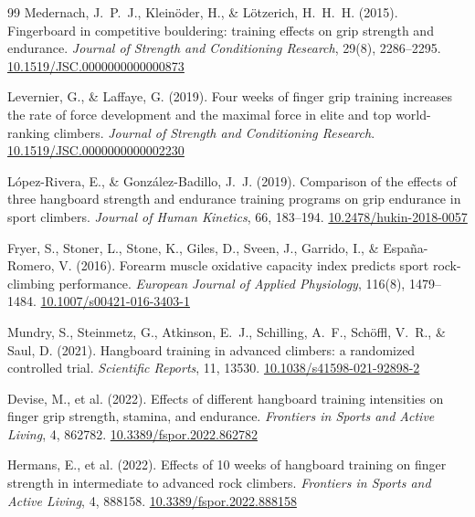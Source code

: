 \documentclass[12pt,a4paper]{article}
\begin{document}
\begin{thebibliography}{99}
Medernach, J.~P.~J., Kleinöder, H., \& Lötzerich, H.~H.~H. (2015).
Fingerboard in competitive bouldering: training effects on grip strength and endurance.
\textit{Journal of Strength and Conditioning Research}, 29(8), 2286--2295.
\href{https://doi.org/10.1519/JSC.0000000000000873}{10.1519/JSC.0000000000000873}

Levernier, G., \& Laffaye, G. (2019).
Four weeks of finger grip training increases the rate of force development and the maximal force in elite and top world-ranking climbers.
\textit{Journal of Strength and Conditioning Research}.
\href{https://doi.org/10.1519/JSC.0000000000002230}{10.1519/JSC.0000000000002230}

López-Rivera, E., \& González-Badillo, J.~J. (2019).
Comparison of the effects of three hangboard strength and endurance training programs on grip endurance in sport climbers.
\textit{Journal of Human Kinetics}, 66, 183--194.
\href{https://doi.org/10.2478/hukin-2018-0057}{10.2478/hukin-2018-0057}

Fryer, S., Stoner, L., Stone, K., Giles, D., Sveen, J., Garrido, I., \& España-Romero, V. (2016).
Forearm muscle oxidative capacity index predicts sport rock-climbing performance.
\textit{European Journal of Applied Physiology}, 116(8), 1479--1484.
\href{https://doi.org/10.1007/s00421-016-3403-1}{10.1007/s00421-016-3403-1}

Mundry, S., Steinmetz, G., Atkinson, E.~J., Schilling, A.~F., Schöffl, V.~R., \& Saul, D. (2021).
Hangboard training in advanced climbers: a randomized controlled trial.
\textit{Scientific Reports}, 11, 13530.
\href{https://doi.org/10.1038/s41598-021-92898-2}{10.1038/s41598-021-92898-2}

Devise, M., et al. (2022).
Effects of different hangboard training intensities on finger grip strength, stamina, and endurance.
\textit{Frontiers in Sports and Active Living}, 4, 862782.
\href{https://doi.org/10.3389/fspor.2022.862782}{10.3389/fspor.2022.862782}

Hermans, E., et al. (2022).
Effects of 10 weeks of hangboard training on finger strength in intermediate to advanced rock climbers.
\textit{Frontiers in Sports and Active Living}, 4, 888158.
\href{https://doi.org/10.3389/fspor.2022.888158}{10.3389/fspor.2022.888158}


\end{thebibliography}
\end{document}
